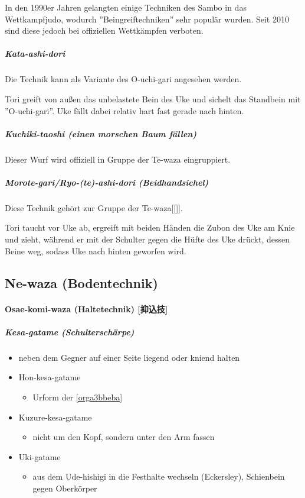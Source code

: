 \documentclass[justified, a4paper, notitlepage, captions=tableheading, nobib]{tufte-handout}
\begin{document}
In den 1990er Jahren gelangten einige Techniken des Sambo in das Wettkampfjudo, wodurch ''Beingreiftechniken'' sehr populär wurden. Seit 2010 sind diese jedoch bei offiziellen Wettkämpfen verboten.

\subparagraph{Kata-ashi-dori}
\label{sec:org8be7a43}

Die Technik kann als Variante des O-uchi-gari angesehen werden.

Tori greift von außen das unbelastete Bein des Uke und sichelt das Standbein mit ''O-uchi-gari''. Uke fällt dabei relativ hart fast gerade nach hinten.

\subparagraph{Kuchiki-taoshi (einen morschen Baum fällen)}
\label{sec:org603da32}
Dieser Wurf wird offiziell in Gruppe der Te-waza eingruppiert.

\subparagraph{Morote-gari/Ryo-(te)-ashi-dori (Beidhandsichel)}
\label{sec:org6d71823}

Diese Technik gehört zur Gruppe der Te-waza[[]].

Tori taucht vor Uke ab, ergreift mit beiden Händen die Zubon des Uke am Knie und zieht, während er mit der Schulter gegen die Hüfte des Uke drückt, dessen Beine weg, sodass Uke nach hinten geworfen wird.


\subsection{Ne-waza (Bodentechnik)}
\label{sec:org5ea59fe}

\paragraph{Osae-komi-waza (Haltetechnik) [抑込技] }
\label{sec:org27e5aaa}

\subparagraph{\label{orga3bbeba}Kesa-gatame (Schulterschärpe)}
\label{sec:orgc2f2db1}
\begin{itemize}
\item neben dem Gegner auf einer Seite liegend oder kniend halten

\item \label{org7af89bc}Hon-kesa-gatame 
\begin{itemize}
\item Urform der \ref{orga3bbeba}
\end{itemize}
\item \label{orgbbede12}Kuzure-kesa-gatame 
\begin{itemize}
\item nicht um den Kopf, sondern unter den Arm fassen
\end{itemize}
\item \label{org41ee881}Uki-gatame         
\begin{itemize}
\item aus dem Ude-hishigi in die Festhalte wechseln (Eckersley), Schienbein gegen Oberkörper
\end{itemize}
\end{itemize}
\end{document}
